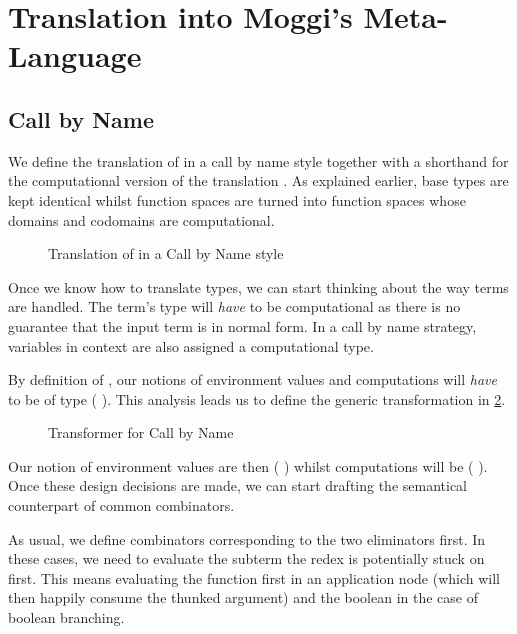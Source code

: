 \section{Translation into Moggi's Meta-Language}

\subsection{Call by Name}

We define the translation  of  in a call by name style together
with a shorthand for the computational version of the translation . As
explained earlier, base types are kept identical whilst function spaces are turned
into function spaces whose domains and codomains are computational.

\begin{figure}[h]
\caption{Translation of  in a Call by Name style\label{fig:moggicbn}}
\end{figure}

Once we know how to translate types, we can start thinking about the way terms are
handled. The term's type will \emph{have} to be computational as there is no guarantee
that the input term is in normal form. In a call by name strategy, variables in context
are also assigned a computational type.

By definition of , our notions of environment values and computations
will \emph{have} to be of type ( ). This analysis leads us to
define the generic transformation  in \cref{fig:cbntransformer}.

\begin{figure}[h]
\caption{ Transformer for Call by Name\label{fig:cbntransformer}}
\end{figure}

Our notion of environment values are then ( )
whilst computations will be ( ). Once these
design decisions are made, we can start drafting the semantical counterpart of
common combinators.

As usual, we define combinators corresponding to the two eliminators first.
In these cases, we need to evaluate the subterm the redex is potentially
stuck on first. This means evaluating the function first in an application
node (which will then happily consume the thunked argument) and the boolean
in the case of boolean branching.

